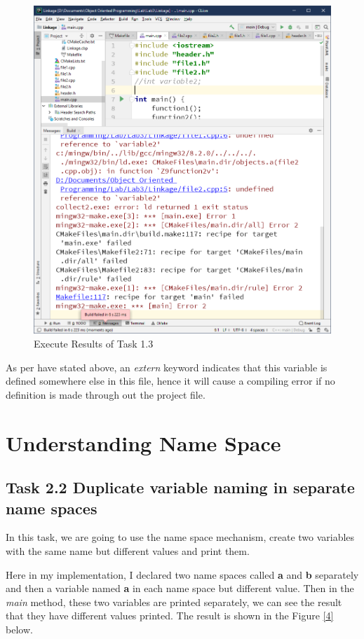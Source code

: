 \documentclass[a4paper]{report}
\begin{document}
\begin{figure}
  \centering
  \includegraphics[scale=0.5]{Onethree.PNG}
  \caption{Execute Results of Task 1.3}\label{3}
\end{figure}


As per have stated above, an \emph{extern} keyword indicates that this variable is defined somewhere else in this file, hence it will cause a compiling error if no definition is made through out the project file.


\chapter{Understanding Name Space}
\section{Task 2.2 Duplicate variable naming in separate name spaces}
In this task, we are going to use the name space mechanism, create two variables with the same name but different values and print them.
\par
Here in my implementation, I declared two name spaces called \textbf{a} and \textbf{b} separately and then a variable named \textbf{a} in each name space but different value. Then in the \emph{main} method, these two variables are printed separately, we can see the result that they have different values printed. The result is shown in the Figure \ref{4} below.
\end{document}
